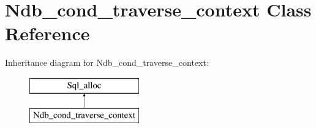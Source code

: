 \hypertarget{classNdb__cond__traverse__context}{}\section{Ndb\+\_\+cond\+\_\+traverse\+\_\+context Class Reference}
\label{classNdb__cond__traverse__context}
Inheritance diagram for Ndb\+\_\+cond\+\_\+traverse\+\_\+context\+:\begin{figure}[H]
\begin{center}
\leavevmode
\includegraphics[height=2.000000cm]{classNdb__cond__traverse__context}
\end{center}
\end{figure}
